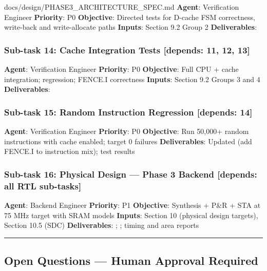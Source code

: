 \begin{relocated}{docs/design/PHASE3_ARCHITECTURE_SPEC.md}
\textbf{Agent}: Verification Engineer \textbf{Priority}: P0
\textbf{Objective}: Directed tests for D-cache FSM correctness,
write-back and write-allocate paths \textbf{Inputs}: Section 9.2 Group 2
\textbf{Deliverables}: 

\subsubsection{Sub-task 14: Cache Integration Tests {[}depends: 11, 12,
13{]}}\label{ds:ch:phase3-architecture:sub-task-14-cache-integration-tests-depends-11-12-13}

\textbf{Agent}: Verification Engineer \textbf{Priority}: P0
\textbf{Objective}: Full CPU + cache integration; regression; FENCE.I
correctness \textbf{Inputs}: Section 9.2 Groups 3 and 4
\textbf{Deliverables}: 

\subsubsection{Sub-task 15: Random Instruction Regression {[}depends:
14{]}}\label{ds:ch:phase3-architecture:sub-task-15-random-instruction-regression-depends-14}

\textbf{Agent}: Verification Engineer \textbf{Priority}: P0
\textbf{Objective}: Run 50,000+ random instructions with cache enabled;
target 0 failures \textbf{Deliverables}: Updated
 (add FENCE.I to instruction mix);
test results

\subsubsection{Sub-task 16: Physical Design --- Phase 3 Backend
{[}depends: all RTL sub-tasks{]}}\label{ds:ch:phase3-architecture:sub-task-16-physical-design-phase-3-backend-depends-all-rtl-sub-tasks}

\textbf{Agent}: Backend Engineer \textbf{Priority}: P1
\textbf{Objective}: Synthesis + P\&R + STA at 75 MHz target with SRAM
models \textbf{Inputs}: Section 10 (physical design targets), Section
10.5 (SDC) \textbf{Deliverables}:
;
; timing and area reports

\begin{center}\rule{0.5\linewidth}{0.5pt}\end{center}

\subsection{Open Questions --- Human Approval Required}\label{ds:ch:phase3-architecture:12-open-questions-human-approval-required}


\end{relocated}
